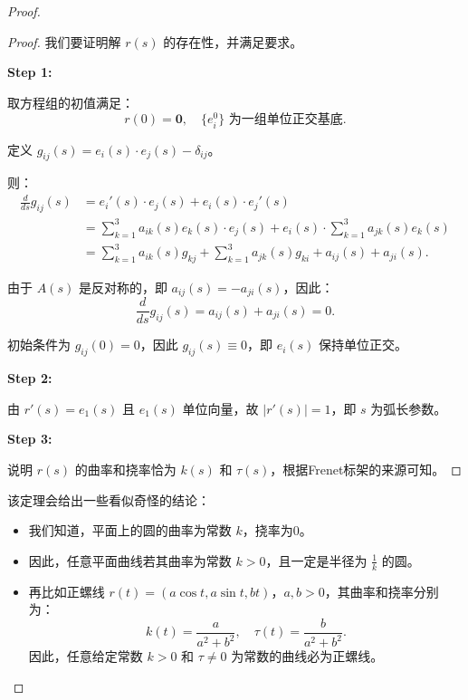 \documentclass[lang=cn,10pt,thmcnt=section]{elegantbook}
\renewcommand{\vec}[1]{\mathbf{#1}}
\begin{document}
\begin{proof}
\begin{proof}
    我们要证明解 $r(s)$ 的存在性，并满足要求。
    
    \textbf{Step 1:}
    
    取方程组的初值满足：
    \[
    r(0) = \vec{0}, \quad \{e_i^0\} \text{ 为一组单位正交基底}.
    \]
    
    定义 \(g_{ij}(s) = e_i(s) \cdot e_j(s) - \delta_{ij}\)。
    
    则：
    \begin{align*}
    \frac{d}{ds} g_{ij}(s) &= e_i'(s) \cdot e_j(s) + e_i(s) \cdot e_j'(s) \\
    &= \sum_{k=1}^3 a_{ik}(s) e_k(s) \cdot e_j(s) + e_i(s) \cdot \sum_{k=1}^3 a_{jk}(s) e_k(s) \\
    &= \sum_{k=1}^3 a_{ik}(s) g_{kj} + \sum_{k=1}^3 a_{jk}(s) g_{ki} + a_{ij}(s) + a_{ji}(s).
    \end{align*}
    
    由于 \(A(s)\) 是反对称的，即 \(a_{ij}(s) = -a_{ji}(s)\)，因此：
    \[
    \frac{d}{ds} g_{ij}(s) = a_{ij}(s) + a_{ji}(s) = 0.
    \]
    
    初始条件为 \(g_{ij}(0) = 0\)，因此 \(g_{ij}(s) \equiv 0\)，即 \(e_i(s)\) 保持单位正交。
    
    \textbf{Step 2:}
    
    由 \(r'(s) = e_1(s)\) 且 \(e_1(s)\) 单位向量，故 \(|r'(s)| = 1\)，即 \(s\) 为弧长参数。
    
    \textbf{Step 3:}
    
    说明 \(r(s)\) 的曲率和挠率恰为 \(k(s)\) 和 \(\tau(s)\)，根据Frenet标架的来源可知。
    \end{proof}
    
    \begin{corollary}
    该定理会给出一些看似奇怪的结论：
    \begin{itemize}
        \item 我们知道，平面上的圆的曲率为常数 \(k\)，挠率为0。
        \item 因此，任意平面曲线若其曲率为常数 \(k > 0\)，且一定是半径为 \(\frac{1}{k}\) 的圆。
        \item 再比如正螺线 \(r(t) = (a \cos t, a \sin t, bt)\)，\(a, b > 0\)，其曲率和挠率分别为：
        \[
        k(t) = \frac{a}{a^2 + b^2}, \quad \tau(t) = \frac{b}{a^2 + b^2}.
        \]
        因此，任意给定常数 \(k > 0\) 和 \(\tau \neq 0\) 为常数的曲线必为正螺线。
    \end{itemize}
    \end{corollary}
\end{proof}
\end{document}
